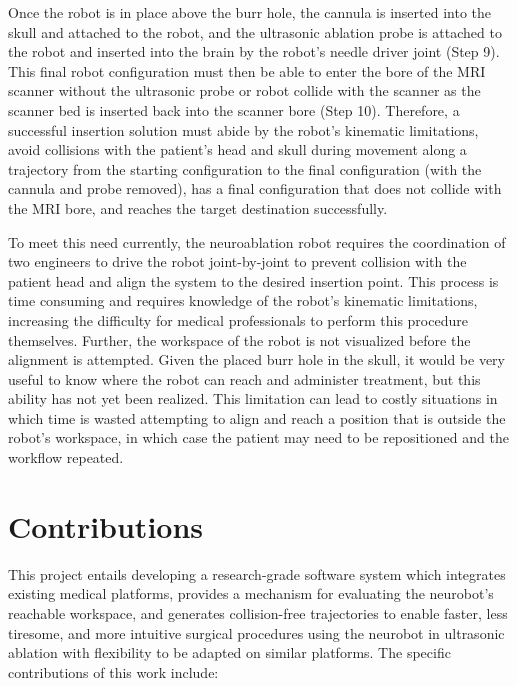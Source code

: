 \documentclass[12pt]{report}
\begin{document}
Once the robot is in place above the burr hole, the cannula is inserted into the skull and attached to the robot, and the ultrasonic ablation probe is attached to the robot and inserted into the brain by the robot's needle driver joint (Step 9). This final robot configuration must then be able to enter the bore of the MRI scanner without the ultrasonic probe or robot collide with the scanner as the scanner bed is inserted back into the scanner bore (Step 10). Therefore, a successful insertion solution must abide by the robot's kinematic limitations, avoid collisions with the patient's head and skull during movement along a trajectory from the starting configuration to the final configuration (with the cannula and probe removed), has a final configuration that does not collide with the MRI bore, and reaches the target destination successfully.

To meet this need currently, the neuroablation robot requires the coordination of two engineers to drive the robot joint-by-joint to prevent collision with the patient head and align the system to the desired insertion point. This process is time consuming and requires knowledge of the robot's kinematic limitations, increasing the difficulty for medical professionals to perform this procedure themselves. Further, the workspace of the robot is not visualized before the alignment is attempted. Given the placed burr hole in the skull, it would be very useful to know where the robot can reach and administer treatment, but this ability has not yet been realized. This limitation can lead to costly situations in which time is wasted attempting to align and reach a position that is outside the robot's workspace, in which case the patient may need to be repositioned and the workflow repeated.

\section{Contributions}
This project entails developing a research-grade software system which integrates existing medical platforms, provides a mechanism for evaluating the neurobot's reachable workspace, and generates collision-free trajectories to enable faster, less tiresome, and more intuitive surgical procedures using the neurobot in ultrasonic ablation with flexibility to be adapted on similar platforms. The specific contributions of this work include:
\end{document}
